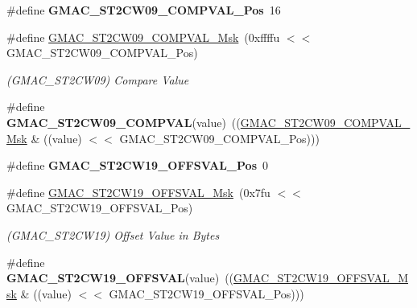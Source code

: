 \begin{DoxyCompactItemize}
\item 
\mbox{\label{group__SAMV71__GMAC_ga7d5ee5b8aa476a616134763980a7e6f2}} 
\#define {\bfseries G\+M\+A\+C\+\_\+\+S\+T2\+C\+W09\+\_\+\+C\+O\+M\+P\+V\+A\+L\+\_\+\+Pos}~16
\item 
\mbox{\label{group__SAMV71__GMAC_gaaa873b33e63edb3fff0c5ce144aa8b54}} 
\#define \mbox{\hyperlink{group__SAMV71__GMAC_gaaa873b33e63edb3fff0c5ce144aa8b54}{G\+M\+A\+C\+\_\+\+S\+T2\+C\+W09\+\_\+\+C\+O\+M\+P\+V\+A\+L\+\_\+\+Msk}}~(0xffffu $<$$<$ G\+M\+A\+C\+\_\+\+S\+T2\+C\+W09\+\_\+\+C\+O\+M\+P\+V\+A\+L\+\_\+\+Pos)
\begin{DoxyCompactList}\small\item\em (G\+M\+A\+C\+\_\+\+S\+T2\+C\+W09) Compare Value \end{DoxyCompactList}\item 
\mbox{\label{group__SAMV71__GMAC_ga880e337c64fedd58b293f503ed5f89f4}} 
\#define {\bfseries G\+M\+A\+C\+\_\+\+S\+T2\+C\+W09\+\_\+\+C\+O\+M\+P\+V\+AL}(value)~((\mbox{\hyperlink{group__SAMV71__GMAC_gaaa873b33e63edb3fff0c5ce144aa8b54}{G\+M\+A\+C\+\_\+\+S\+T2\+C\+W09\+\_\+\+C\+O\+M\+P\+V\+A\+L\+\_\+\+Msk}} \& ((value) $<$$<$ G\+M\+A\+C\+\_\+\+S\+T2\+C\+W09\+\_\+\+C\+O\+M\+P\+V\+A\+L\+\_\+\+Pos)))
\item 
\mbox{\label{group__SAMV71__GMAC_ga6157100413566972a68e4fd8d4bb3bb5}} 
\#define {\bfseries G\+M\+A\+C\+\_\+\+S\+T2\+C\+W19\+\_\+\+O\+F\+F\+S\+V\+A\+L\+\_\+\+Pos}~0
\item 
\mbox{\label{group__SAMV71__GMAC_ga225165898a62c677b2926748ba4d7b1b}} 
\#define \mbox{\hyperlink{group__SAMV71__GMAC_ga225165898a62c677b2926748ba4d7b1b}{G\+M\+A\+C\+\_\+\+S\+T2\+C\+W19\+\_\+\+O\+F\+F\+S\+V\+A\+L\+\_\+\+Msk}}~(0x7fu $<$$<$ G\+M\+A\+C\+\_\+\+S\+T2\+C\+W19\+\_\+\+O\+F\+F\+S\+V\+A\+L\+\_\+\+Pos)
\begin{DoxyCompactList}\small\item\em (G\+M\+A\+C\+\_\+\+S\+T2\+C\+W19) Offset Value in Bytes \end{DoxyCompactList}\item 
\mbox{\label{group__SAMV71__GMAC_gad4aae9ea059049158ee5e6ffe68fb4af}} 
\#define {\bfseries G\+M\+A\+C\+\_\+\+S\+T2\+C\+W19\+\_\+\+O\+F\+F\+S\+V\+AL}(value)~((\mbox{\hyperlink{group__SAMV71__GMAC_ga225165898a62c677b2926748ba4d7b1b}{G\+M\+A\+C\+\_\+\+S\+T2\+C\+W19\+\_\+\+O\+F\+F\+S\+V\+A\+L\+\_\+\+Msk}} \& ((value) $<$$<$ G\+M\+A\+C\+\_\+\+S\+T2\+C\+W19\+\_\+\+O\+F\+F\+S\+V\+A\+L\+\_\+\+Pos)))

\end{DoxyCompactItemize}
